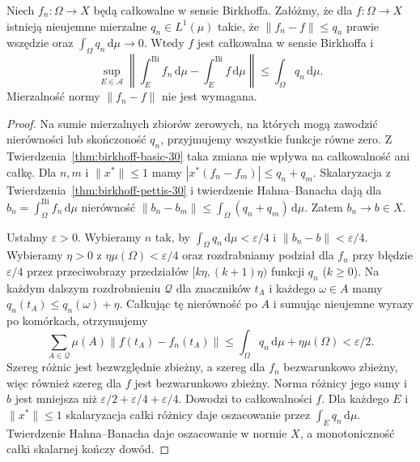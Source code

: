 \begin{twierdzenie}
\label{thm:birkhoff-limit-30}
Niech $f_n:\Omega\to X$ będą całkowalne w sensie
Birkhoffa. Załóżmy, że dla $f:\Omega\to X$ istnieją
nieujemne mierzalne $q_n\in L^1(\mu)$ takie, że
$\|f_n-f\|\le q_n$ prawie wszędzie oraz
$\int_\Omega q_n\,\mathrm d\mu\to0$.
Wtedy $f$ jest całkowalna w sensie Birkhoffa i
\[
 \sup_{E\in\mathcal A}
 \left\|\int_E^{\mathrm{Bi}} f_n\,\mathrm d\mu
       -\int_E^{\mathrm{Bi}} f\,\mathrm d\mu\right\|
 \le\int_\Omega q_n\,\mathrm d\mu.
\]
Mierzalność normy $\|f_n-f\|$ nie jest wymagana.
\end{twierdzenie}
\begin{proof}
Na sumie mierzalnych zbiorów zerowych, na których
mogą zawodzić nierówności lub skończoność $q_n$,
przyjmujemy wszystkie funkcje równe zero.
Z Twierdzenia~\ref{thm:birkhoff-basic-30} taka
zmiana nie wpływa na całkowalność ani całkę.
Dla $n,m$ i $\|x^*\|\le1$ mamy
$|x^*(f_n-f_m)|\le q_n+q_m$.
Skalaryzacja z Twierdzenia~\ref{thm:birkhoff-pettis-30}
i twierdzenie Hahna--Banacha dają dla
$b_n=\int_\Omega^{\mathrm{Bi}}f_n\,\mathrm d\mu$
nierówność $\|b_n-b_m\|\le\int_\Omega(q_n+q_m)\,\mathrm d\mu$.
Zatem $b_n\to b\in X$.

Ustalmy $\varepsilon>0$. Wybieramy $n$ tak, by
$\int_\Omega q_n\,\mathrm d\mu<\varepsilon/4$
i $\|b_n-b\|<\varepsilon/4$.
Wybieramy $\eta>0$ z $\eta\mu(\Omega)<\varepsilon/4$
oraz rozdrabniamy podział dla $f_n$ przy błędzie
$\varepsilon/4$ przez przeciwobrazy przedziałów
$[k\eta,(k+1)\eta)$ funkcji $q_n$ ($k\ge0$).
Na każdym dalszym rozdrobnieniu $\mathcal Q$
dla znaczników $t_A$ i każdego $\omega\in A$
mamy $q_n(t_A)\le q_n(\omega)+\eta$.
Całkując tę nierówność po $A$ i sumując
nieujemne wyrazy po komórkach, otrzymujemy
\[
 \sum_{A\in\mathcal Q}\mu(A)\|f(t_A)-f_n(t_A)\|
 \le\int_\Omega q_n\,\mathrm d\mu+\eta\mu(\Omega)
 <\varepsilon/2.
\]
Szereg różnic jest bezwzględnie zbieżny, a szereg
dla $f_n$ bezwarunkowo zbieżny, więc również
szereg dla $f$ jest bezwarunkowo zbieżny.
Norma różnicy jego sumy i $b$ jest mniejsza niż
$\varepsilon/2+\varepsilon/4+\varepsilon/4$.
Dowodzi to całkowalności $f$.
Dla każdego $E$ i $\|x^*\|\le1$ skalaryzacja
całki różnicy daje oszacowanie przez
$\int_E q_n\,\mathrm d\mu$. Twierdzenie
Hahna--Banacha daje oszacowanie w normie $X$,
a monotoniczność całki skalarnej kończy dowód.
\end{proof}

